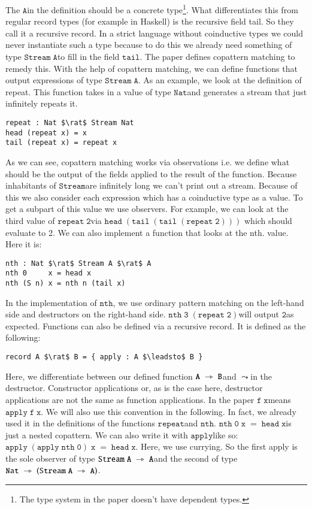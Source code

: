 \documentclass[a4paper,cleardoubleempty,BCOR1cm]{scrbook}
\begin{document}
The $\mathtt{A}$\;in the definition should be a concrete
type\footnote{The type system in the paper doesn't have dependent types.}.
What differentiates this from regular record types (for example in Haskell) is
the recursive field tail. So they call it a recursive record. In a strict
language without coinductive types we could never instantiate such a type
because to do this we already need something of type $\mathtt{Stream\;A}$\;to fill in the
field $\mathtt{tail}$. The paper defines copattern matching to remedy this. With the
help of copattern matching, we can define functions that output expressions of
type $\mathtt{Stream\;A}$. As an example, we look at the definition of repeat. This
function takes in a value of type $\mathtt{Nat}$\;and generates a stream that just
infinitely repeats it.

\begin{lstlisting}
repeat : Nat $\rat$ Stream Nat
head (repeat x) = x
tail (repeat x) = repeat x
\end{lstlisting}

As we can see, copattern matching works via observations i.e. we define what
should be the output of the fields applied to the result of the function.
Because inhabitants of $\mathtt{Stream}$\;are infinitely long we can't print out a
stream. Because of this we also consider each expression which has a
coinductive type as a value. To get a subpart of this value we use observers.
For example, we can look at the third value of $\mathtt{repeat\;2}$\;via $\mathtt{head\;(tail\;(tail\;(repeat\;2)))}$
which should evaluate to 2. We can also implement a
function that looks at the nth. value. Here it is:

\begin{lstlisting}
nth : Nat $\rat$ Stream A $\rat$ A
nth 0     x = head x
nth (S n) x = nth n (tail x)
\end{lstlisting}

In the implementation of $\mathtt{nth}$, we use ordinary pattern matching on the left-hand side and
destructors on the right-hand side. $\mathtt{nth\;3\;(repeat\;2)}$\;will output $\mathtt{2}$\;as expected.
Functions can also be defined via a recursive record.  It is defined as the
following:

\begin{lstlisting}
record A $\rat$ B = { apply : A $\leadsto$ B }
\end{lstlisting}

Here, we differentiate between our defined function $\mathtt{A\;\rightarrowtriangle\;B}$\;and $\mathtt{\leadsto}$\;in the
destructor. Constructor applications or, as is the case here, destructor
applications are not the same as function applications. In the
paper $\mathtt{f\;x}$\;means $\mathtt{apply\;f\;x}$. We will also use this convention in the
following. In fact, we already used it in the definitions of the functions
$\mathtt{repeat}$\;and $\mathtt{nth}$. $\mathtt{nth\;0\;x\;=\;head\;x}$\;is just a nested copattern. We can also write it
with $\mathtt{apply}$\;like so: $\mathtt{apply\;(apply\;nth\;0)\;x\;=\;head\;x}$. Here, we use currying.
So the first apply is the sole observer of type $\mathtt{Stream\;A\;\rightarrowtriangle\;A}$\;and the second
of type $\mathtt{Nat\;\rightarrowtriangle\;(Stream\;A\;\rightarrowtriangle\;A)}$.
\end{document}
